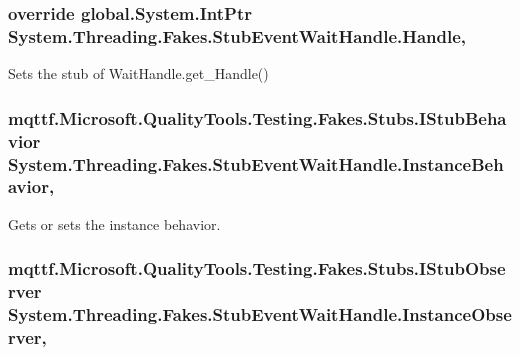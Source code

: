 \hypertarget{class_system_1_1_threading_1_1_fakes_1_1_stub_event_wait_handle_a6da0ecf5ec64e5461b117bced2054de5}{
\subsubsection[{Handle}]{\setlength{\rightskip}{0pt plus 5cm}override global.\-System.\-Int\-Ptr System.\-Threading.\-Fakes.\-Stub\-Event\-Wait\-Handle.\-Handle\hspace{0.3cm}{\ttfamily [get]}, {\ttfamily [set]}}}\label{class_system_1_1_threading_1_1_fakes_1_1_stub_event_wait_handle_a6da0ecf5ec64e5461b117bced2054de5}


Sets the stub of Wait\-Handle.\-get\-\_\-\-Handle()

\hypertarget{class_system_1_1_threading_1_1_fakes_1_1_stub_event_wait_handle_a6fee6e49abc2cde6be7ad4bec8bfecd4}{
\subsubsection[{Instance\-Behavior}]{\setlength{\rightskip}{0pt plus 5cm}mqttf.\-Microsoft.\-Quality\-Tools.\-Testing.\-Fakes.\-Stubs.\-I\-Stub\-Behavior System.\-Threading.\-Fakes.\-Stub\-Event\-Wait\-Handle.\-Instance\-Behavior\hspace{0.3cm}{\ttfamily [get]}, {\ttfamily [set]}}}\label{class_system_1_1_threading_1_1_fakes_1_1_stub_event_wait_handle_a6fee6e49abc2cde6be7ad4bec8bfecd4}


Gets or sets the instance behavior.

\hypertarget{class_system_1_1_threading_1_1_fakes_1_1_stub_event_wait_handle_a912c3977ab86a5c66c5538ebd114fcb1}{
\subsubsection[{Instance\-Observer}]{\setlength{\rightskip}{0pt plus 5cm}mqttf.\-Microsoft.\-Quality\-Tools.\-Testing.\-Fakes.\-Stubs.\-I\-Stub\-Observer System.\-Threading.\-Fakes.\-Stub\-Event\-Wait\-Handle.\-Instance\-Observer\hspace{0.3cm}{\ttfamily [get]}, {\ttfamily [set]}}}\label{class_system_1_1_threading_1_1_fakes_1_1_stub_event_wait_handle_a912c3977ab86a5c66c5538ebd114fcb1}


